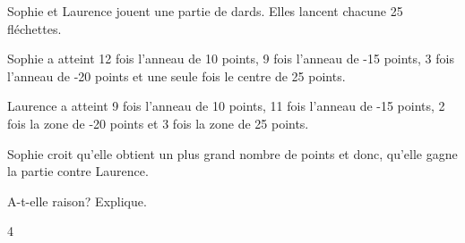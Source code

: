 \documentclass[11pt]{article}
\begin{document}
\vspace{3mm}
\begin{minipage}[t]{0.62\linewidth}
Sophie et Laurence jouent une partie de dards. Elles lancent chacune 25 fléchettes.

\vspace{2mm}
Sophie a atteint 12 fois l'anneau de 10 points, 9 fois l'anneau de -15 points, 3 fois l'anneau de -20 points et une seule fois le centre de 25 points.

\vspace{2mm}
Laurence a atteint 9 fois l'anneau de 10 points, 11 fois l'anneau de -15 points, 2 fois la zone de -20 points et 3 fois la zone de 25 points.

\vspace{2mm}
Sophie croit qu'elle obtient un plus grand nombre de points et donc, qu'elle gagne la partie contre Laurence.

\vspace{2mm}
A-t-elle raison? Explique.
\end{minipage}%
\hfill
\begin{minipage}[t]{0.34\linewidth}
\centering
{}
\end{minipage}

\vfill
\begin{center}
4
\end{center}
\end{document}
